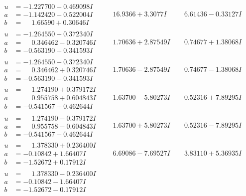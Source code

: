 \documentclass[1p]{elsarticle_modified}
\theoremstyle{definition}
\begin{document}
$$\begin{array}{c|c|c}
\begin{aligned}
u &= -1.227700 - 0.469098 I \\
a &= -1.142420 - 0.522004 I \\
b &= \phantom{-}1.66590 + 0.30646 I\end{aligned}
 & \phantom{-}16.9366 + 3.3077 I & \phantom{-}6.61436 - 0.33127 I \\ \hline\begin{aligned}
u &= -1.264550 + 0.372340 I \\
a &= \phantom{-}0.346462 - 0.320746 I \\
b &= -0.563190 + 0.341593 I\end{aligned}
 & \phantom{-}1.70636 + 2.87549 I & \phantom{-}0.74677 + 1.38068 I \\ \hline\begin{aligned}
u &= -1.264550 - 0.372340 I \\
a &= \phantom{-}0.346462 + 0.320746 I \\
b &= -0.563190 - 0.341593 I\end{aligned}
 & \phantom{-}1.70636 - 2.87549 I & \phantom{-}0.74677 - 1.38068 I \\ \hline\begin{aligned}
u &= \phantom{-}1.274190 + 0.379172 I \\
a &= \phantom{-}0.955758 + 0.604843 I \\
b &= -0.541567 + 0.462644 I\end{aligned}
 & \phantom{-}1.63700 - 5.80273 I & \phantom{-}0.52316 + 7.89295 I \\ \hline\begin{aligned}
u &= \phantom{-}1.274190 - 0.379172 I \\
a &= \phantom{-}0.955758 - 0.604843 I \\
b &= -0.541567 - 0.462644 I\end{aligned}
 & \phantom{-}1.63700 + 5.80273 I & \phantom{-}0.52316 - 7.89295 I \\ \hline\begin{aligned}
u &= \phantom{-}1.378330 + 0.236400 I \\
a &= -0.10842 + 1.66407 I \\
b &= -1.52672 + 0.17912 I\end{aligned}
 & \phantom{-}6.69086 - 7.69527 I & \phantom{-}3.83110 + 5.36935 I \\ \hline\begin{aligned}
u &= \phantom{-}1.378330 - 0.236400 I \\
a &= -0.10842 - 1.66407 I \\
b &= -1.52672 - 0.17912 I\end{aligned}

\end{array}$$
\end{document}
